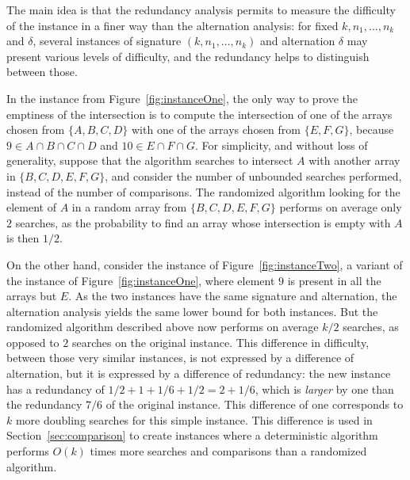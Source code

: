 The main idea is that the redundancy analysis permits to measure the
difficulty of the instance in a finer way than the alternation
analysis: for fixed $k,n_1,\ldots,n_k$ and $\delta$, several instances
of signature $(k,n_1,\ldots,n_k)$ and alternation $\delta$ may present
various levels of difficulty, and the redundancy helps to distinguish
between those.
%
\begin{example}
In the instance from Figure~\ref{fig:instanceOne}, the only way to
prove the emptiness of the intersection is to compute the intersection
of one of the arrays chosen from $\{A,B,C,D\}$ with one of the arrays
chosen from $\{E,F,G\}$, because $9\in A\cap B\cap C\cap D$ and $10\in
E\cap F\cap G$.
%
For simplicity, and without loss of generality, suppose that the
algorithm searches to intersect $A$ with another array in
$\{B,C,D,E,F,G\}$, and consider the number of unbounded searches
performed, instead of the number of comparisons.
%
The randomized algorithm looking for the element of $A$ in a random
array from $\{B,C,D,E,F,G\}$ performs on average only $2$ searches, as
the probability to find an array whose intersection is empty with $A$
is then $1/2$.

On the other hand, consider the instance of
Figure~\ref{fig:instanceTwo}, a variant of the instance of
Figure~\ref{fig:instanceOne}, where element $9$ is present in all the
arrays but $E$.
%
As the two instances have the same signature and alternation, the
alternation analysis yields the same lower bound for both instances.
%
But the randomized algorithm described above now performs on average
$k/2$ searches, as opposed to $2$ searches on the original instance.
%
This difference in difficulty, between those very similar instances,
is not expressed by a difference of alternation, but it is expressed
by a difference of redundancy: the new instance has a redundancy of
${1/2}{+}1{+}{1/6}{+}{1/2}=2{+}{1/6}$, which is {\em
larger} by one than the redundancy ${7/6}$ of the original
instance.
%
This difference of one corresponds to $k$ more doubling searches for
this simple instance.
%
This difference is used in Section~\ref{sec:comparison} to create
instances where a deterministic algorithm performs $O(k)$ times more
searches and comparisons than a randomized algorithm.
\end{example}

